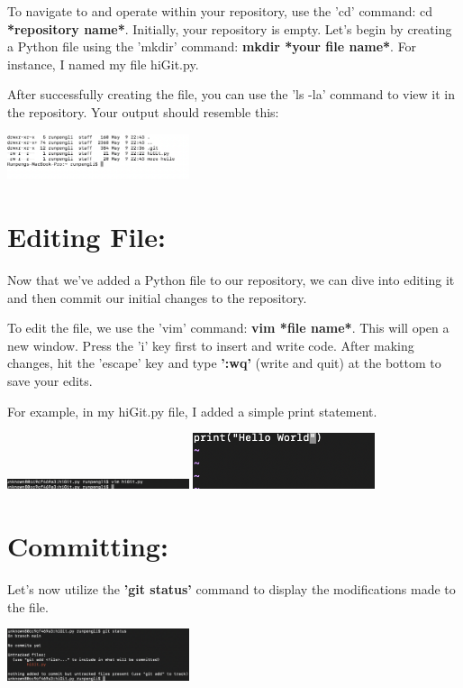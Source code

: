 \documentclass[10pt,twocolumn]{article}
\begin{document}
To navigate to and operate within your repository, use the 'cd' command: cd \textbf{*repository name*}. Initially, your repository is empty. Let's begin by creating a Python file using the 'mkdir' command: \textbf{ mkdir *your file name*}. For instance, I named my file hiGit.py.

After successfully creating the file, you can use the 'ls -la' command to view it in the repository. Your output should resemble this:

\includegraphics[width = 0.4\textwidth]{Branches.png}


\section{Editing File:}

Now that we've added a Python file to our repository, we can dive into editing it and then commit our initial changes to the repository.

To edit the file, we use the 'vim' command: \textbf{vim *file name*}. This will open a new window. Press the 'i' key first to insert and write code. After making changes, hit the 'escape' key and type \textbf{':wq'} (write and quit) at the bottom to save your edits.

For example, in my hiGit.py file, I added a simple print statement.

\includegraphics[width = 0.4\textwidth]{Ef.png}
\includegraphics[width = 0.4\textwidth]{EF2.png}



\section{Committing: }

Let's now utilize the \textbf{'git status'} command to display the modifications made to the file.

\includegraphics[width = 0.4\textwidth]{Commiting.png}
\end{document}

